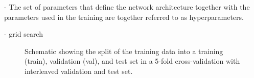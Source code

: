 - The set of parameters that define the network architecture together with the parameters used in the training are together referred to as hyperparameters.


- grid search


\begin{figure}[t]
    \caption{Schematic showing the split of the training data into a training (train), validation (val), and test set in a 5-fold cross-validation with interleaved validation and test set.}
    \label{fig:k-fold-method}
\end{figure}
